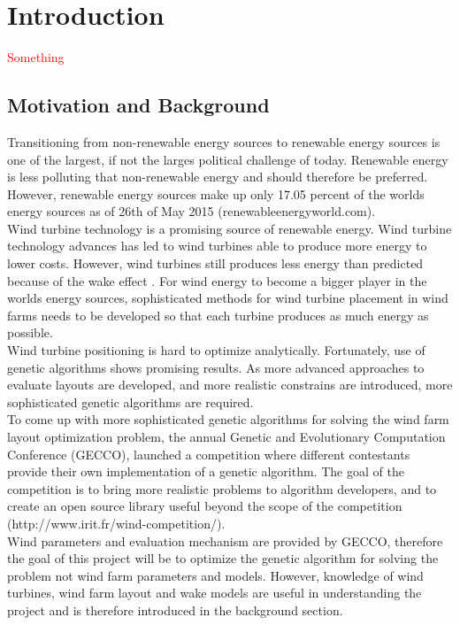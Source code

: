 \chapter{Introduction}
\textcolor{red}{Something}

\section{Motivation and Background}
Transitioning from non-renewable energy sources to renewable energy sources is one of the largest, if not the larges political challenge of today. Renewable energy is less polluting that non-renewable energy and should therefore be preferred. However, renewable energy sources make up only 17.05 percent of the worlds energy sources as of 26th of May 2015 (renewableenergyworld.com). \\

\noindent Wind turbine technology is a promising source of renewable energy. Wind turbine technology advances has led to wind turbines able to produce more energy to lower costs. However, wind turbines still produces less energy than predicted because of the wake effect \citep{Samorani}. For wind energy to become a bigger player in the worlds energy sources, sophisticated methods for wind turbine placement in wind farms needs to be developed so that each turbine produces as much energy as possible. \\

\noindent Wind turbine positioning is hard to optimize analytically. Fortunately, use of genetic algorithms shows promising results. As more advanced approaches to evaluate layouts are developed, and more realistic constrains are introduced, more sophisticated genetic algorithms are required. \\

\noindent To come up with more sophisticated genetic algorithms for solving the wind farm layout optimization problem, the annual Genetic and Evolutionary Computation Conference (GECCO), launched a competition where different contestants provide their own implementation of a genetic algorithm. The goal of the competition is to bring more realistic problems to algorithm developers, and to create an open source library useful beyond the scope of the competition (http://www.irit.fr/wind-competition/). \\

\noindent Wind parameters and evaluation mechanism are provided by GECCO, therefore the goal of this project will be to optimize the genetic algorithm for solving the problem not wind farm parameters and models. However, knowledge of wind turbines, wind farm layout and wake models are useful in understanding the project and is therefore introduced in the background section. 



